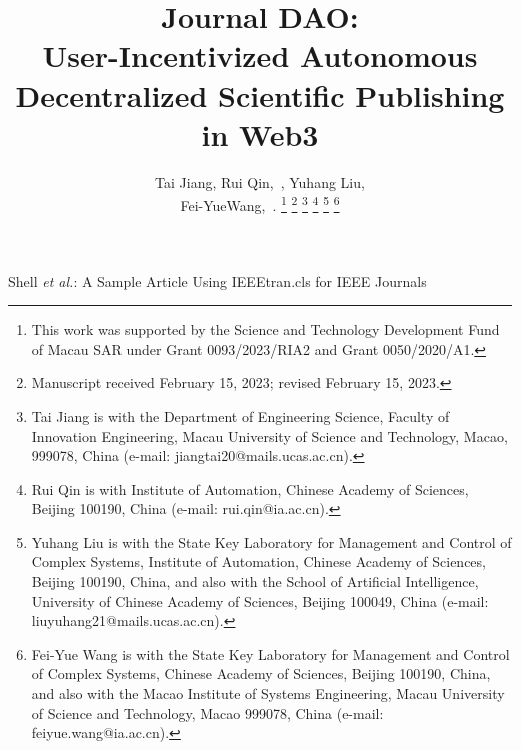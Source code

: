 \documentclass[lettersize,journal]{IEEEtran}
\begin{document}
\title{Journal DAO: \\ User-Incentivized Autonomous Decentralized Scientific Publishing in Web3}

\author{Tai Jiang, Rui Qin,~, Yuhang Liu, \\
 Fei-YueWang,~.
\thanks{This work was supported by the Science and Technology Development Fund of Macau SAR under Grant 0093/2023/RIA2 and  Grant 0050/2020/A1.}%
\thanks{Manuscript received February 15, 2023; revised February 15, 2023.}
\thanks{Tai Jiang is with the Department of Engineering Science, Faculty of Innovation Engineering, Macau University of Science and Technology, Macao, 999078, China (e-mail: jiangtai20@mails.ucas.ac.cn).}
\thanks{Rui Qin is with Institute of Automation, Chinese Academy of Sciences, Beijing 100190, China (e-mail: rui.qin@ia.ac.cn).}
\thanks{Yuhang Liu is with the State Key Laboratory for Management and Control of Complex Systems, Institute of Automation, Chinese Academy of Sciences, Beijing 100190, China, and also with the School of Artificial Intelligence, University of Chinese Academy of Sciences, Beijing 100049, China (e-mail: liuyuhang21@mails.ucas.ac.cn).}
\thanks{Fei-Yue Wang is with the State Key Laboratory for Management and Control of Complex Systems, Chinese Academy of Sciences, Beijing 100190, China, and also with the Macao Institute of Systems Engineering, Macau University of Science and Technology, Macao 999078, China (e-mail: feiyue.wang@ia.ac.cn).}

}

%
{Shell \MakeLowercase{\textit{et al.}}: A Sample Article Using IEEEtran.cls for IEEE Journals}


\maketitle
\end{document}
